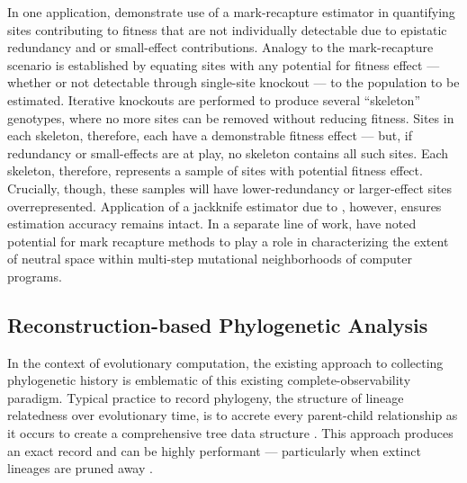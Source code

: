 In one application, \citet{moreno2024methods} demonstrate use of a mark-recapture estimator in quantifying sites contributing to fitness that are not individually detectable due to epistatic redundancy and or small-effect contributions.
Analogy to the mark-recapture scenario is established by equating sites with any potential for fitness effect --- whether or not detectable through single-site knockout --- to the population to be estimated.
Iterative knockouts are performed to produce several ``skeleton'' genotypes, where no more sites can be removed without reducing fitness.
Sites in each skeleton, therefore, each have a demonstrable fitness effect --- but, if redundancy or small-effects are at play, no skeleton contains all such sites.
Each skeleton, therefore, represents a sample of sites with potential fitness effect.
Crucially, though, these samples will have lower-redundancy or larger-effect sites overrepresented.
Application of a jackknife estimator due to \citet{burnham1979robust}, however, ensures estimation accuracy remains intact.
In a separate line of work, \citet{schulte2014software} have noted potential for mark recapture methods to play a role in characterizing the extent of neutral space within multi-step mutational neighborhoods of computer programs.

\subsection{Reconstruction-based Phylogenetic Analysis}

In the context of evolutionary computation, the existing approach to collecting phylogenetic history is emblematic of this existing complete-observability paradigm.
Typical practice to record phylogeny, the structure of lineage relatedness over evolutionary time, is to accrete every parent-child relationship as it occurs to create a comprehensive tree data structure \citep{moreno2024algorithms}.
This approach produces an exact record and can be highly performant --- particularly when extinct lineages are pruned away \citep{dolson2024phylotrackpy}.

